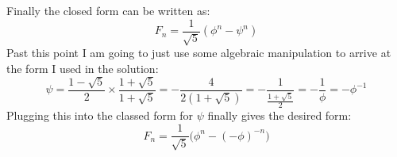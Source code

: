 \documentclass[12pt, letterpaper, onecolumn, conference, final]{IEEEtran}
\theoremstyle{definition}
\theoremstyle{plain}
\begin{document}
Finally the closed form can be written as:
\begin{equation*}
F_n = \frac{1}{\sqrt{5}} (\phi^n - \psi^n)
\end{equation*}
Past this point I am going to just use some algebraic manipulation to arrive at the form I used in the solution:
\begin{equation*}
\psi = \frac{1 - \sqrt{5}}{2} \times \frac{1 + \sqrt{5}}{1 + \sqrt{5}} = -\frac{4}{2(1 + \sqrt{5})} = -\frac{1}{\frac{1 + \sqrt{5}}{2}} = -\frac{1}{\phi} = -\phi^{-1}
\end{equation*}
Plugging this into the classed form for $\psi$ finally gives the desired form:
\begin{equation*}
F_n = \frac{1}{\sqrt{5}} \Big( \phi^n - ( -\phi)^{-n} \Big)
\end{equation*}
\end{document}
